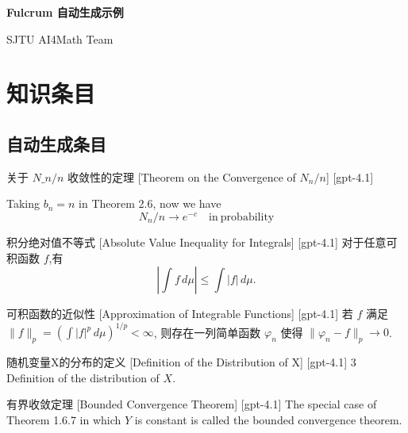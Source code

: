 \documentclass[UTF8]{ctexart}
\begin{document}
    \begin{center}
        {\LARGE\textbf{Fulcrum 自动生成示例}}

        SJTU AI4Math Team
    \end{center}

    \section{知识条目}
    \subsection{自动生成条目}

    
    \begin{thm}
        {关于 $N\_n / n$ 收敛性的定理}
        [Theorem on the Convergence of $N_n / n$]
        [gpt-4.1]
        
Taking $b_n = n$ in Theorem 2.6, now we have
\[
N_n / n \to e^{-c} \quad \mathrm{in~probability}
\]

    \end{thm}
    
    
    
    \begin{ppt}
        {积分绝对值不等式}
        [Absolute Value Inequality for Integrals]
        [gpt-4.1]
        对于任意可积函数 $f$,有
\[
|\int f \, d\mu| \leq \int |f| \, d\mu.
\]
    \end{ppt}
    
    
    
    \begin{thm}
        {可积函数的近似性}
        [Approximation of Integrable Functions]
        [gpt-4.1]
        若 $f$ 满足 $\|f\|_p = \left( \int |f|^p \, d\mu \right)^{1/p} < \infty$, 则存在一列简单函数 $\varphi_n$ 使得 $\|\varphi_n - f\|_p \to 0$.
    \end{thm}
    
    
    
    \begin{dfn}
        {随机变量X的分布的定义}
        [Definition of the Distribution of X]
        [gpt-4.1]
        3 Definition of the distribution of $X$.
    \end{dfn}
    
    
    
    \begin{thm}
        {有界收敛定理}
        [Bounded Convergence Theorem]
        [gpt-4.1]
        The special case of Theorem 1.6.7 in which $Y$ is constant is called the bounded convergence theorem.
    \end{thm}
    
\end{document}
